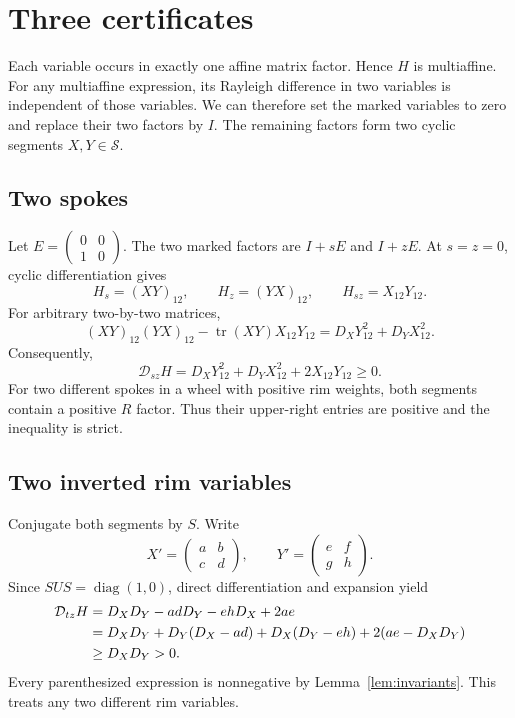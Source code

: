 \documentclass[11pt]{article}
\newcommand{\tr}{\operatorname{tr}}
\newcommand{\Del}{\mathcal D}
\begin{document}
\section{Three certificates}
Each variable occurs in exactly one affine matrix factor. Hence $H$ is multiaffine. For any multiaffine expression, its Rayleigh difference in two variables is independent of those variables. We can therefore set the marked variables to zero and replace their two factors by $I$. The remaining factors form two cyclic segments $X,Y\in\mathcal S$.

\subsection{Two spokes}
Let $E=\left(\begin{smallmatrix}0&0\\1&0\end{smallmatrix}\right)$. The two marked factors are $I+sE$ and $I+zE$. At $s=z=0$, cyclic differentiation gives
\[
 H_s=(XY)_{12},\qquad H_z=(YX)_{12},\qquad H_{sz}=X_{12}Y_{12}.
\]
For arbitrary two-by-two matrices,
\[
 (XY)_{12}(YX)_{12}-\tr(XY)X_{12}Y_{12}
 =D_XY_{12}^2+D_YX_{12}^2.
\]
Consequently,
\begin{equation}\label{eq:ss}
 \boxed{\Del_{sz}H=D_XY_{12}^2+D_YX_{12}^2+2X_{12}Y_{12}\ge0.}
\end{equation}
For two different spokes in a wheel with positive rim weights, both segments contain a positive $R$ factor. Thus their upper-right entries are positive and the inequality is strict.

\subsection{Two inverted rim variables}
Conjugate both segments by $S$. Write
\[
 X'=\begin{pmatrix}a&b\\c&d\end{pmatrix},\qquad
 Y'=\begin{pmatrix}e&f\\g&h\end{pmatrix}.
\]
Since $SUS=\operatorname{diag}(1,0)$, direct differentiation and expansion yield
\begin{align}
 \Del_{tz}H
 &=D_XD_Y-adD_Y-ehD_X+2ae\label{eq:rr}\\
 &=D_XD_Y+D_Y(D_X-ad)+D_X(D_Y-eh)+2(ae-D_XD_Y)\notag\\
 &\ge D_XD_Y>0.\notag
\end{align}
Every parenthesized expression is nonnegative by Lemma~\ref{lem:invariants}. This treats any two different rim variables.
\end{document}
